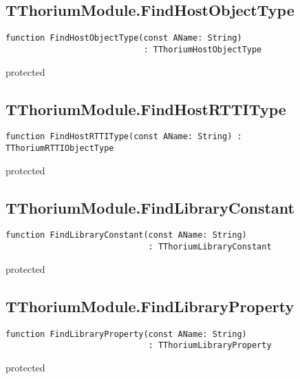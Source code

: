 \subsection{TThoriumModule.FindHostObjectType}
\label{thoriumcore:thorium:tthoriummodule:findhostobjecttype}
\begin{FPCList}
\Synopsis
\Declaration 

\begin{verbatim}
function FindHostObjectType(const AName: String)
                            : TThoriumHostObjectType
\end{verbatim}
\Visibility
protected
\Description
\Errors
\end{FPCList}
\subsection{TThoriumModule.FindHostRTTIType}
\label{thoriumcore:thorium:tthoriummodule:findhostrttitype}
\begin{FPCList}
\Synopsis
\Declaration 

\begin{verbatim}
function FindHostRTTIType(const AName: String) : TThoriumRTTIObjectType
\end{verbatim}
\Visibility
protected
\Description
\Errors
\end{FPCList}
\subsection{TThoriumModule.FindLibraryConstant}
\label{thoriumcore:thorium:tthoriummodule:findlibraryconstant}
\begin{FPCList}
\Synopsis
\Declaration 

\begin{verbatim}
function FindLibraryConstant(const AName: String)
                             : TThoriumLibraryConstant
\end{verbatim}
\Visibility
protected
\Description
\Errors
\end{FPCList}
\subsection{TThoriumModule.FindLibraryProperty}
\label{thoriumcore:thorium:tthoriummodule:findlibraryproperty}
\begin{FPCList}
\Synopsis
\Declaration 

\begin{verbatim}
function FindLibraryProperty(const AName: String)
                             : TThoriumLibraryProperty
\end{verbatim}
\Visibility
protected
\Description
\Errors
\end{FPCList}
